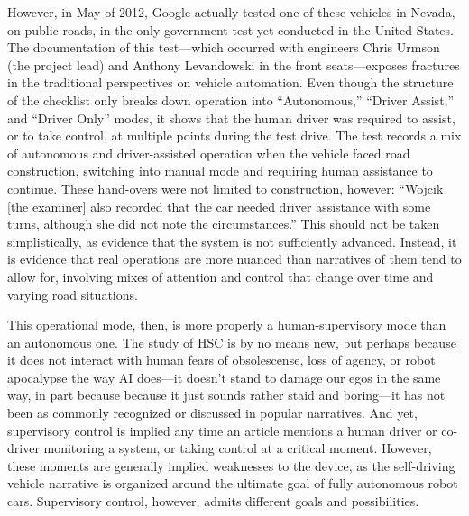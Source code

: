 
However, in May of 2012,
Google actually tested one of these vehicles in Nevada, on public
roads, in the only government test yet conducted in the United States.
The documentation of this test---which occurred with engineers Chris
Urmson (the project lead) and Anthony Levandowski in the front
seats---exposes fractures in the traditional perspectives on vehicle
automation.\cite{harrisNevada} Even though the structure of the
checklist only breaks down operation into ``Autonomous,'' ``Driver
Assist,'' and ``Driver Only'' modes, it shows that the human driver
was required to assist, or to take control, at multiple points during
the test drive. The test records a mix of autonomous and
driver-assisted operation when the vehicle faced road construction,
switching into manual mode and requiring human assistance to continue.
These hand-overs were not limited to construction, however: 
``Wojcik [the examiner] also recorded that the car needed driver
assistance with some turns, although she did not note the
circumstances.''\cite{harrisNevada} This should not be taken
simplistically, as evidence that the system is not sufficiently
advanced. Instead, it is evidence that real operations are more
nuanced than narratives of them tend to allow for, involving mixes of
attention and control that change over time and varying road situations.

This operational mode, then, is more properly a human-supervisory mode
than an autonomous one. The study of HSC is by no means new, but
perhaps because it does not interact with human fears of obsolescense,
loss of agency, or robot apocalypse the way AI does---it doesn't stand
to damage our egos in the same way, in part because because it just
sounds rather staid and boring---it has not been as commonly
recognized or discussed in popular narratives. And yet, supervisory
control is implied any time an article mentions a human driver or
co-driver monitoring a system, or taking control at a critical moment.
However, these moments are generally implied weaknesses to the device,
as the self-driving vehicle narrative is organized around the ultimate
goal of fully autonomous robot cars. Supervisory control, however,
admits different goals and possibilities.

